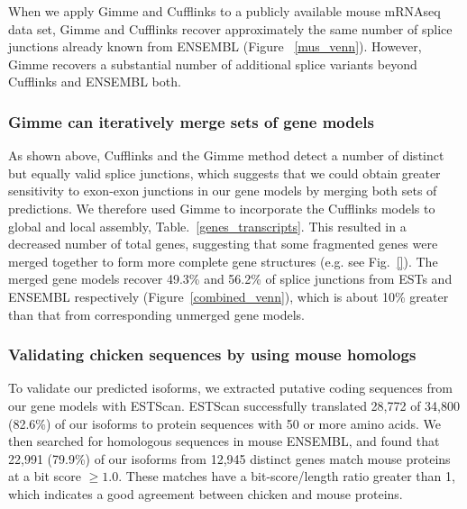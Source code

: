 \documentclass[10pt]{article}
\begin{document}

When we apply Gimme and Cufflinks to a publicly available mouse mRNAseq data
set, Gimme and Cufflinks recover approximately the same number of splice
junctions already known from ENSEMBL (Figure ~\ref{mus_venn}).  However, Gimme
recovers a substantial number of additional splice variants beyond Cufflinks and
ENSEMBL both.



\subsubsection*{Gimme can iteratively merge sets of gene models}


As shown above, Cufflinks and the Gimme method detect a number of distinct but
equally valid splice junctions, which suggests that we could obtain greater
sensitivity to exon-exon junctions in our gene models by merging both sets of
predictions.  We therefore used Gimme to incorporate the Cufflinks models to
global and local assembly, Table.~\ref{genes_transcripts}.  This resulted in a
decreased number of total genes, suggesting that some fragmented genes were
merged together to form more complete gene structures (e.g. see
Fig.~\ref{}). The merged gene models recover 49.3\% and 56.2\% of
splice junctions from ESTs and ENSEMBL respectively
(Figure~\ref{combined_venn}), which is about 10\% greater than that from
corresponding unmerged gene models.


\subsubsection*{Validating chicken sequences by using mouse homologs}

To validate our predicted isoforms, we extracted putative coding sequences from
our gene models with ESTScan\cite{Iseli:1999vd}.  ESTScan successfully
translated 28,772 of 34,800 (82.6\%) of our isoforms to protein sequences with
50 or more amino acids.  We then searched for homologous sequences in mouse
ENSEMBL, and found that 22,991 (79.9\%) of our isoforms from 12,945 distinct
genes match mouse proteins at a bit score $\ge1.0$.
These matches have a bit-score/length ratio greater than 1, which indicates a
good agreement between chicken and mouse proteins.
\end{document}
